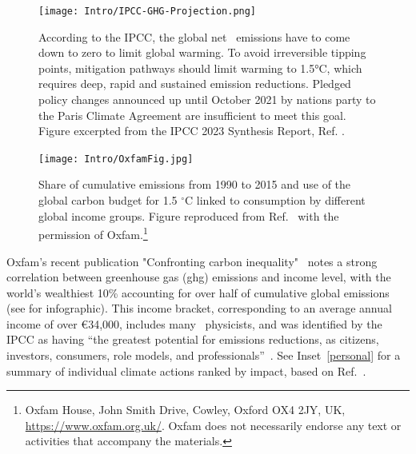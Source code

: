 \documentclass[../SustainableHEP.tex]{subfiles}
\begin{document}

\begin{figure}
    \centering
    \texttt{[image: Intro/IPCC-GHG-Projection.png]}
    \caption[Necessary reduction in global emissions]%
        {According to the IPCC, the global net \CdO\ emissions have to come down to zero to limit global warming. To avoid irreversible tipping points, mitigation pathways should limit warming to 1.5°C, which requires deep, rapid and sustained emission reductions.  Pledged policy changes announced up until October 2021 by nations party to the Paris Climate Agreement are insufficient to meet this goal.  Figure excerpted from the IPCC 2023 Synthesis Report, Ref. \cite{IPCC2023SynthesisSPM}.
        \label{fig:ene-netco2}}
    \end{figure}


\begin{figure}
    \centering
    \texttt{[image: Intro/OxfamFig.jpg]}
    \caption[Global emissions (1990-2015) by income groups]{Share of cumulative emissions from 1990 to 2015 and use of the global carbon budget for 1.5 $^{\circ}$C linked to consumption by different global income groups. Figure reproduced from Ref.~\cite{Oxfam2020} with the permission of Oxfam.\footnote{Oxfam House, John Smith Drive, Cowley, Oxford OX4 2JY, UK, \url{https://www.oxfam.org.uk/}.  Oxfam does not necessarily endorse any text or activities that accompany the materials.}}
    \label{fig:OxfamFig}
\end{figure}

Oxfam's recent publication "Confronting carbon inequality"~\cite{Oxfam2020} notes a strong correlation between greenhouse gas (\acrshort{ghg}) emissions and income level, with the world's wealthiest 10\% accounting for over half of cumulative global emissions (see  for infographic). This income bracket, corresponding to an average annual income of over \euro{34,000}, includes many \ACR\ physicists, and was identified by the IPCC as having ``the greatest potential for emissions reductions, \eg as citizens, investors, consumers, role models, and professionals''~\cite{IPCC2022reportSPM}.  See Inset~\ref{personal} for a summary of individual climate actions ranked by impact, based on Ref.~\cite{Wynes_2017}. 
\end{document}
